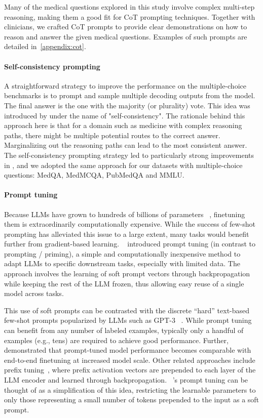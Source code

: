 Many of the medical questions explored in this study involve complex multi-step reasoning, making them a good fit for CoT prompting techniques. Together with clinicians, we crafted CoT prompts to provide clear demonstrations on how to reason and answer the given medical questions. Examples of such prompts are detailed in~\ref{appendix:cot}.

\paragraph{Self-consistency prompting} A straightforward strategy to improve the performance on the multiple-choice benchmarks is to prompt and sample multiple decoding outputs from the model. The final answer is the one with the majority (or plurality) vote. This idea was introduced by \citet{wang2022self} under the name of "self-consistency". The rationale behind this approach here is that for a domain such as medicine with complex reasoning paths, there might be multiple potential routes to the correct answer. Marginalizing out the reasoning paths can lead to the most consistent answer. The self-consistency prompting strategy led to particularly strong improvements in \cite{lewkowycz2022solving}, and we adopted the same approach for our datasets with multiple-choice questions: MedQA, MedMCQA, PubMedQA and MMLU. 

\paragraph{Prompt tuning} Because LLMs have grown to hundreds of billions of parameters ~\cite{brown2020language, chowdhery2022palm}, finetuning them is extraordinarily computationally expensive. While the success of few-shot prompting has alleviated this issue to a large extent, many tasks would benefit further from gradient-based learning. ~\citet{lester2021power} introduced prompt tuning (in contrast to prompting / priming), a simple and computationally inexpensive method to adapt LLMs to specific downstream tasks, especially with limited data. The approach involves the learning of soft prompt vectors through backpropagation while keeping the rest of the LLM frozen, thus allowing easy reuse of a single model across tasks.

This use of soft prompts can be contrasted with the discrete “hard” text-based few-shot prompts popularized by LLMs such as GPT-3 ~\cite{brown2020language}. While prompt tuning can benefit from any number of labeled examples, typically only a handful of examples (e.g., tens) are required to achieve good performance. Further, ~\citet{lester2021power} demonstrated that prompt-tuned model performance becomes comparable with end-to-end finetuning at increased model scale. Other related approaches include prefix tuning~\cite{li2021prefix}, where prefix activation vectors are prepended to each layer of the LLM encoder and learned through backpropagation. ~\citet{lester2021power}’s prompt tuning can be thought of as a simplification of this idea, restricting the learnable parameters to only those representing a small number of tokens prepended to the input as a soft prompt.

